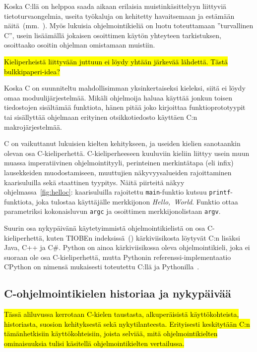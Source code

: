 Koska C:llä on helppoa saada aikaan erilaisia muistinkäsittelyyn liittyviä
tietoturvaongelmia, useita työkaluja on kehitetty havaitsemaan ja estämään
näitä~(mm.~\citet{valgrind,asan}). Myös lukuisia ohjelmointikieliä on luotu
toteuttamaan ''turvallinen C'', usein lisäämällä jokaisen osoittimen käytön
yhteyteen tarkistuksen, osoittaako osoitin ohjelman omistamaan muistiin.

\hl{Kieliperheistä liittyvään juttuun ei löydy yhtään järkevää lähdettä. Tästä
bulkkipaperi-idea?}

Koska C on suunniteltu mahdollisimman yksinkertaiseksi kieleksi, siitä ei löydy
omaa moduulijärjestelmää. Mikäli ohjelmoija haluaa käyttää jonkun toisen
tiedostojen sisältämää funktiota, hänen pitää joko kirjoittaa
funktioprototyypit tai sisällyttää ohjelmaan erityinen otsikkotiedosto käyttäen
C:n makrojärjestelmää.

C on vaikuttanut lukuisien kielten kehitykseen, ja useiden kielien sanotaankin
olevan osa C-kieliperhettä. C-kieliperheeseen kuuluviin kieliin liittyy usein
muun muassa imperatiivinen ohjelmointityyli, perinteinen merkintätapa (eli
infix) lausekkeiden muodostamiseen, muuttujien näkyvyysalueiden rajoittaminen
kaarisuluilla sekä staattinen tyypitys. Näitä piirteitä näkyy
ohjelmassa~\ref{fig:helloc}: kaarisuluilla rajoitettu \texttt{main}-funktio
kutsuu \texttt{printf}-funktiota, joka tulostaa käyttäjälle merkkijonon
\emph{Hello,~World}. Funktio ottaa parametriksi kokonaisluvun \texttt{argc} ja
osoittimen merkkijonolistaan \texttt{argv}.

Suurin osa nykypäivänä käytetyimmistä ohjelmointikielistä on osa
C-kieliperhettä, kuten TIOBEn indeksissä~(\citeyear{tiobe}) kärkiviisikosta
löytyvät C:n lisäksi Java, C++ ja C\#. Python on ainoa kärkiviisikossa oleva
ohjelmointikieli, joka ei suoraan ole osa C-kieliperhettä, mutta Pythonin
referenssi-implementaatio CPython on nimensä mukaisesti toteutettu
C:llä ja Pythonilla~\citep{cpython}.

\subsection{C-ohjelmointikielen historiaa ja nykypäivää}
\label{sec:ctaustaa}

\hl{Tässä aliluvussa kerrotaan C-kielen taustasta, alkuperäisistä
käyttökohteista, historiasta, suosion kehityksestä sekä nykytilanteesta.
Erityisesti keskitytään C:n tämänhetkisiin käyttökohteisiin, joista selviää,
mitä ohjelmointikielten ominaisuuksia tulisi käsitellä ohjelmointikielten
vertailussa.}

